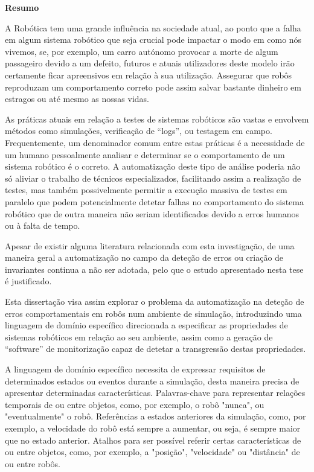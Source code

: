 
\vspace*{2cm}
\begin{center} \Large \bf Resumo
\end{center}
\vspace*{1cm} \setlength{\baselineskip}{0.6cm}

A Robótica tem uma grande influência na sociedade atual, ao ponto que a falha em algum sistema robótico que seja crucial pode impactar o modo em como nós vivemos, se, por exemplo, um carro autónomo provocar a morte de algum passageiro devido a um defeito, futuros e atuais utilizadores deste modelo irão certamente ficar apreensivos em relação à sua utilização. Assegurar que robôs reproduzam um comportamento correto pode assim salvar bastante dinheiro em estragos ou até mesmo as nossas vidas.

As práticas atuais em relação a testes de sistemas robóticos são vastas e envolvem métodos como simulações, verificação de “logs”, ou testagem em campo. Frequentemente, um denominador comum entre estas práticas é a necessidade de um humano pessoalmente analisar e determinar se o comportamento de um sistema robótico é o correto. A automatização deste tipo de análise poderia não só aliviar o trabalho de técnicos especializados, facilitando assim a realização de testes, mas também possivelmente permitir a execução massiva de testes em paralelo que podem potencialmente detetar falhas no comportamento do sistema robótico que de outra maneira não seriam identificados devido a erros humanos ou à falta de tempo.

Apesar de existir alguma literatura relacionada com esta investigação, de uma maneira geral a automatização no campo da deteção de erros ou criação de invariantes continua a não ser adotada, pelo que o estudo apresentado nesta tese é justificado. 

Esta dissertação visa assim explorar o problema da automatização na deteção de erros comportamentais em robôs num ambiente de simulação, introduzindo uma linguagem de domínio específico direcionada a especificar as propriedades de sistemas robóticos em relação ao seu ambiente, assim como a geração de “software” de monitorização capaz de detetar a transgressão destas propriedades.

A linguagem de domínio específico necessita de expressar requisitos de determinados estados ou eventos durante a simulação, desta maneira precisa de apresentar determinadas características. Palavras-chave para representar relações temporais de ou entre objetos, como, por exemplo, o robô "nunca", ou "eventualmente" o robô. Referências a estados anteriores da simulação, como, por exemplo, a velocidade do robô está sempre a aumentar, ou seja, é sempre maior que no estado anterior. Atalhos para ser possível referir certas características de ou entre objetos, como, por exemplo, a "posição", "velocidade" ou "distância" de ou entre robôs.

